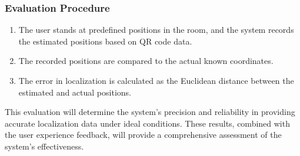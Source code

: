 \subsubsection*{Evaluation Procedure}
\begin{enumerate}
	\item The user stands at predefined positions in the room, and the system records the estimated positions based on QR code data.
	\item The recorded positions are compared to the actual known coordinates.
	\item The error in localization is calculated as the Euclidean distance between the estimated and actual positions.
\end{enumerate}

This evaluation will determine the system’s precision and reliability in providing accurate localization data under ideal conditions. These results, combined with the user experience feedback, will provide a comprehensive assessment of the system's effectiveness.











